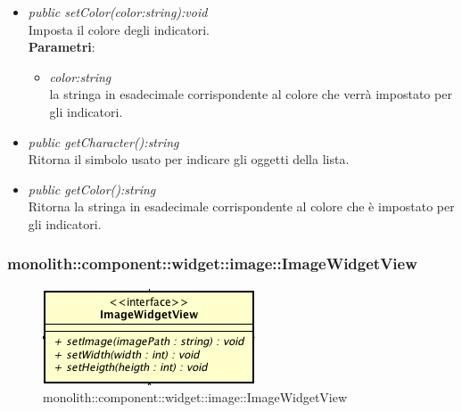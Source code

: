 \begin{itemize}
\begin{itemize}
	\item \textit{public setColor(color:string):void}\\
	Imposta il colore degli indicatori.
		\\ \textbf{Parametri}: \begin{itemize}
		\item \textit{color:string}\\
		la stringa in esadecimale corrispondente al colore che verrà impostato per gli indicatori.
		\end{itemize} 
	\item \textit{public getCharacter():string}\\
	Ritorna il simbolo usato per indicare gli oggetti della lista.
	\item \textit{public getColor():string}\\
	Ritorna la stringa in esadecimale corrispondente al colore che è impostato per gli indicatori.
	\end{itemize}
\end{itemize}

\subsubsection{monolith::component::widget::image::ImageWidgetView}

\label{monolith::component::widget::image::ImageWidgetView}
\begin{figure}[H]
	\centering
	\includegraphics[scale=0.5]{Sezioni/SottosezioniST/img/ImageWidgetView.png}
	\caption{monolith::component::widget::image::ImageWidgetView}
\end{figure}


